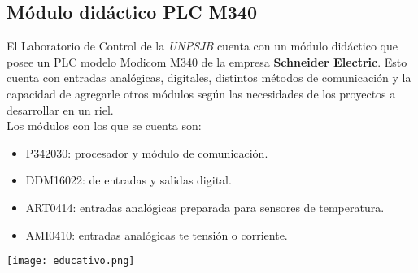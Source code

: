 \subsection{Módulo didáctico PLC M340} \label{sec:didac}

El Laboratorio de Control de la \textit{UNPSJB} cuenta con un módulo didáctico que posee un PLC modelo Modicom M340 de la empresa \textbf{Schneider Electric}. Esto cuenta con entradas analógicas, digitales, distintos métodos de comunicación y la capacidad de agregarle otros módulos según las necesidades de los proyectos a desarrollar en un riel.  \\
Los módulos con los que se cuenta son:
\begin{itemize}
	\item P342030: procesador y módulo de comunicación.
	\item DDM16022: de entradas y salidas digital.
	\item ART0414: entradas analógicas preparada para sensores de temperatura.
	\item AMI0410: entradas analógicas te tensión o corriente. 
	
\end{itemize}
\begin{center}
	\texttt{[image: educativo.png]}
	\label{fig:didac}
\end{center}





